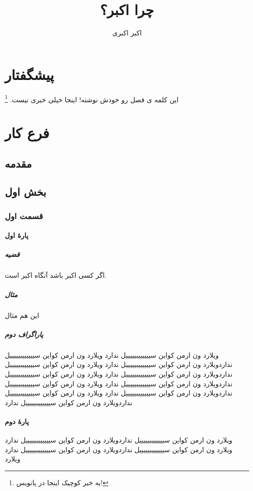 \documentclass{book}
\author{اکبر اکبری}
\title{چرا اکبر؟}
\begin{document}
	\maketitle
 	\tableofcontents
 	\chapter{پیشگفتار}
 	\label{key}
 	این کلمه ی فصل رو خودش نوشته! اینجا خیلی خبری نیست. \footnote{یه خبر کوچیک اینجا در پانویس!}
 	\chapter{فرع کار}
 	\section{مقدمه}
	\section{بخش اول}
	\subsection{قسمت اول}
	\subsubsection[تو فهرست اینو نشون بده نه اصلی رو]{پارهٔ اول}
	\paragraph{قضیه}
	اگر کسی اکبر باشد آنگاه اکبر است.
	\paragraph{مثال}
	این هم مثال
	
	\paragraph{پاراگراف دوم}
	ویلارد ون ارمن کواین سییییییبیییییل ندارد ویلارد ون ارمن کواین سییییییبیییییل نداردویلارد ون ارمن کواین سییییییبیییییل ندارد ویلارد ون ارمن کواین سییییییبیییییل نداردویلارد ون ارمن کواین سییییییبیییییل ندارد ویلارد ون ارمن کواین سییییییبیییییل نداردویلارد ون ارمن کواین سییییییبیییییل ندارد ویلارد ون ارمن کواین سییییییبیییییل نداردویلارد ون ارمن کواین سییییییبیییییل ندارد ویلارد ون ارمن کواین سییییییبیییییل نداردویلارد ون ارمن کواین سییییییبیییییل ندارد
	\subsubsection*{پارهٔ دوم}
	 ویلارد ون ارمن کواین سییییییبیییییل نداردویلارد ون ارمن کواین سییییییبیییییل ندارد ویلارد ون ارمن کواین سییییییبیییییل نداردویلارد ون ارمن کواین سییییییبیییییل ندارد ویلارد 
\end{document}
